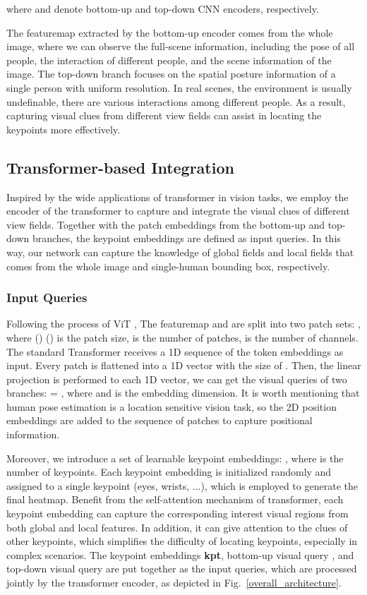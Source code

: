 \documentclass[runningheads]{llncs}
\begin{document}
where  and  denote bottom-up and top-down CNN encoders, respectively.

The featuremap extracted by the bottom-up encoder comes from the whole image, where we can observe the full-scene information, including the pose of all people, the interaction of different people, and the scene information of the image. The top-down branch focuses on the spatial posture information of a single person with uniform resolution. In real scenes, the environment is usually undefinable, there are various interactions among different people. As a result, capturing visual clues from different view fields can assist in locating the keypoints more effectively.

\subsection{Transformer-based Integration}
Inspired by the wide applications of transformer in vision tasks, we employ the encoder of the transformer to capture and integrate the visual clues of different view fields. 
Together with the patch embeddings from the bottom-up and top-down branches, the keypoint embeddings are defined as input queries. In this way, our network can capture the knowledge of global fields and local fields that comes from the whole image and single-human bounding box, respectively.

\subsubsection{Input Queries}
Following the process of ViT \cite{VIT2020}, The featuremap  and  are split into two patch sets: , where () () is the patch size,  is the number of patches,  is the number of channels. The standard Transformer \cite{transformer2017} receives a 1D sequence of the token embeddings as input. Every patch is flattened into a 1D vector with the size of . Then, the linear projection is performed to each 1D vector, we can get the visual queries of two branches:  = , where  and  is the embedding dimension. It is worth mentioning that human pose estimation is a location sensitive vision task, so the 2D position embeddings are added to the sequence of patches to capture positional information.

Moreover, we introduce a set of learnable keypoint embeddings: , where  is the number of keypoints. Each keypoint embedding is initialized randomly and assigned to a single keypoint (eyes, wrists, ...), which is employed to generate the final heatmap. Benefit from the self-attention mechanism of transformer, each keypoint embedding can capture the corresponding interest visual regions from both global and local features. In addition, it can give attention to the clues of other keypoints, which simplifies the difficulty of locating keypoints, especially in complex scenarios. The keypoint embeddings \textbf{kpt}, bottom-up visual query , and top-down visual query  are put together as the input queries, which are processed jointly by the transformer encoder, as depicted in Fig.~\ref{overall_architecture}. 
\end{document}
